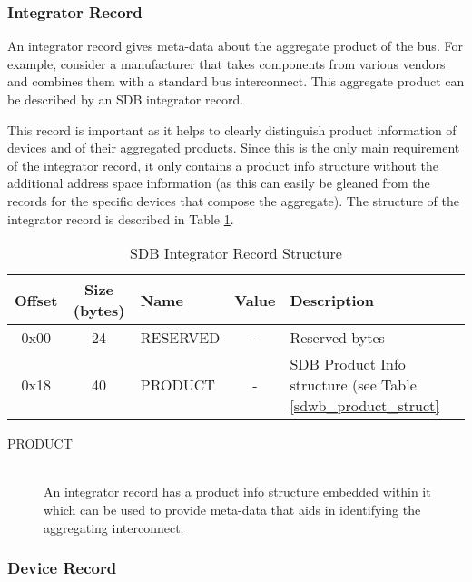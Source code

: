 \documentclass[a4paper, 12pt]{article}
\begin{document}
\subsubsection{Integrator Record}

An integrator record gives meta-data about the aggregate product of the bus. For example, consider
a manufacturer that takes components from various vendors and combines them with a standard bus
interconnect. This aggregate product can be described by an SDB integrator record.

This record is important as it helps to clearly distinguish product information of devices and of
their aggregated products. Since this is the only main requirement of the integrator record, it
only contains a product info structure without the additional address space information (as this
can easily be gleaned from the records for the specific devices that compose the aggregate). The
structure of the integrator record is described in Table \ref{sdwb_integrator_struct}.

\begin{center}
  \begin{savenotes}
    \begin{table}[!ht]\footnotesize
      \caption{SDB Integrator Record Structure}\label{sdwb_integrator_struct}\centering
        \begin{tabular}{| c | c | l | c | p{5cm} |} \hline
        Offset & Size (bytes) & Name & Value & Description \\ \hline
        0x00 & 24 & RESERVED & - & Reserved bytes \\ \hline
        0x18 & 40 & PRODUCT & - & SDB Product Info structure (see Table \ref{sdwb_product_struct} \\ \hline
        \end{tabular}
    \end{table}
  \end{savenotes}
\end{center}

\begin{description}
\item[PRODUCT] \hfill \\
An integrator record has a product info structure embedded within it which can be used
to provide meta-data that aids in identifying the aggregating interconnect.
\end{description}

\subsubsection{Device Record}
\end{document}
